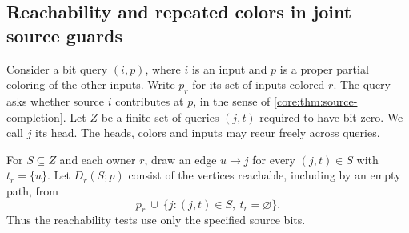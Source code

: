 \subsection{Reachability and repeated colors in joint source guards}
\label{app:core-injective-blockers}

Consider a bit query $(i,p)$, where $i$ is an input and $p$ is a proper
partial coloring of the other inputs. Write $p_r$ for its set of inputs
colored $r$. The query asks whether source $i$ contributes at $p$, in
the sense of \cref{core:thm:source-completion}. Let $Z$ be a finite set
of queries $(j,t)$ required to have bit zero. We call $j$ its head.
The heads, colors and inputs may recur freely across queries.

For $S\subseteq Z$ and each owner $r$, draw an edge $u\to j$ for
every $(j,t)\in S$ with $t_r=\{u\}$. Let $D_r(S;p)$ consist of the
vertices reachable, including by an empty path, from
\[
 p_r\ \cup\ \{j:(j,t)\in S,\ t_r=\varnothing\}.
\]
Thus the reachability tests use only the specified source bits.

